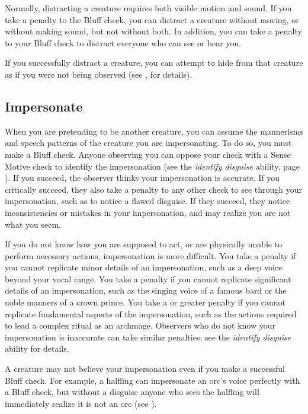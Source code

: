         Normally, distracting a creature requires both visible motion and sound.
        If you take a  penalty to the Bluff check, you can distract a creature without moving, or without making sound, but not without both.
        In addition, you can take a  penalty to your Bluff check to distract everyone who can see or hear you.

        If you successfully distract a creature, you can attempt to hide from that creature as if you were not being observed (see , for details).

    \subsection{Impersonate}\label{Impersonate}
        When you are pretending to be another creature, you can assume the mannerisms and speech patterns of the creature you are impersonating.
        To do so, you must make a Bluff check.
        Anyone observing you can oppose your check with a Sense Motive check to identify the impersonation (see the \textit{identify disguise} ability, page ).
        If you succeed, the observer thinks your impersonation is accurate.
        If you critically succeed, they also take a  penalty to any other check to see through your impersonation, such as to notice a flawed disguise.
        If they succeed, they notice inconsistencies or mistakes in your impersonation, and may realize you are not what you seem.

        If you do not know how you are supposed to act, or are physically unable to perform necessary actions, impersonation is more difficult.
        You take a  penalty if you cannot replicate minor details of an impersonation, such as a deep voice beyond your vocal range.
        You take a  penalty if you cannot replicate significant details of an impersonation, such as the singing voice of a famous bard or the noble manners of a crown prince.
        You take a  or greater penalty if you cannot replicate fundamental aspects of the impersonation, such as the actions required to lead a complex ritual as an archmage.
        Observers who do not know your impersonation is inaccurate can take similar penalties; see the \textit{identify disguise} ability for details.

        A creature may not believe your impersonation even if you make a successful Bluff check.
        For example, a halfling can impersonate an orc's voice perfectly with a Bluff check, but without a disguise anyone who sees the halfling will immediately realize it is not an orc (see ).

